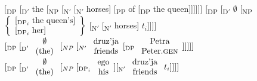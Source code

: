 \documentclass[output=paper,colorlinks,citecolor=brown]{langscibook}
\begin{document}
\ea \label{ex:zi91:60}
    \ea \label{ex:zi91:60a} $[$\textsubscript{DP} [\textsubscript{D$'$} the [\textsubscript{NP} [\textsubscript{N$'$} [\textsubscript{N$'$} horses] [\textsubscript{PP} of [\textsubscript{DP} the queen]]]]]]
    \ex \label{ex:zi91:60b} 
    $[$\textsubscript{DP} [\textsubscript{D$'$} $\emptyset$ [\textsubscript{NP} $\left\{ \begin{array}{l} [_{\text{DP}_i} \; \text{the queen's}] \\\relax [_{\text{DP}_{i}} \; \text{her}] \end{array} \right\}$ [\textsubscript{N$'$} [\textsubscript{N$'$} horses] $t_i$]]]]
    \z
\ex \label{ex:zi91:61}
    \ea \label{ex:zi91:61a} $[_{\text{DP}} \; [\textsubscript{D$'$} \; \begin{array}{c} \emptyset \\ \text{(the)} \end{array} \; [_{NP} \; [_{N'} \; \begin{array}{c} \text{druz'ja} \\ \text{friends} \end{array} [_{\text{DP}} \; \begin{array}{c} \text{Petra} \\ \text{Peter.\textsc{gen}} \end{array}]]]]]$
    \ex \label{ex:zi91:61b} $[_{\text{DP}} \; [\textsubscript{D$'$} \; \begin{array}{c} \emptyset \\ \text{(the)} \end{array} \; [_{NP} \; [_{\text{DP}_{i}} \; \begin{array}{c} \text{ego} \\ \text{his} \end{array}] [\textsubscript{N$'$} \; \begin{array}{c} \text{druz'ja} \\ \text{friends} \end{array} \; t_{i}]]]]$
    \z
\z
\end{document}
